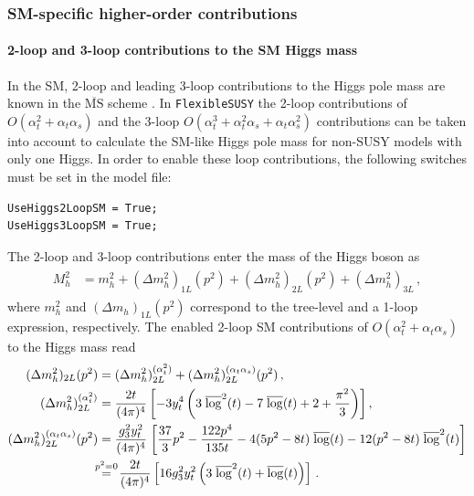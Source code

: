 \documentclass[final,3p,11pt,pdflatex]{elsarticle}
\makeatletter
\newcommand{\fs}{\texttt{FlexibleSUSY}\@\xspace}
\newcommand{\ol}[1]{\overline{#1}}
\newcommand{\MSbar}{\ensuremath{\ol{\text{MS}}}\xspace}
\newcommand{\barlog}{\overline{\log}}
\def\at{\alpha_t}
\def\as{\alpha_s}
\makeatother
\begin{document}
\subsubsection{SM-specific higher-order contributions}

\paragraph{2-loop and 3-loop contributions to the SM Higgs mass}

In the SM, 2-loop and leading 3-loop contributions to the Higgs pole
mass are known in the \MSbar scheme
\cite{Degrassi:2012ry,Vega:2015fna,Martin:2014cxa}.  In \fs the 2-loop
contributions of $O(\at^2 + \at \as)$
\cite{Vega:2015fna,Martin:2014cxa} and the 3-loop
$O(\at^3 + \at^2 \as + \at \as^2)$ contributions \cite{Martin:2014cxa}
can be taken into account to calculate the SM-like Higgs pole mass for
non-SUSY models with only one Higgs. In order to enable these loop
contributions, the following switches must be set in the model file:
%
\begin{lstlisting}
UseHiggs2LoopSM = True;
UseHiggs3LoopSM = True;
\end{lstlisting}
%
The 2-loop and 3-loop
contributions enter the mass of the Higgs boson as
\begin{align} 
 \begin{split}
   M_h^2 &= m_h^2 + (\Delta m_h^2)_{1L}(p^2)
   + (\Delta m_h^2)_{2L}(p^2) +(\Delta m_h^2)_{3L} \,,
 \end{split} \label{eq:Mh_polp^2}
\end{align}
where $m_h^2$ and $(\Delta m_h)_{1L}(p^2)$ correspond to the tree-level 
and a 1-loop expression, respectively.
The enabled 2-loop SM contributions of
$O(\at^2 + \at \as)$ to the Higgs mass read
%
\begin{align}
  (\Delta m_h^2)_{2L}(p^2) &= (\Delta m_h^2)_{2L}^{(\at^2)} + 
     (\Delta m_h^2)_{2L}^{(\at\as)}(p^2) \,, \\
  (\Delta m_h^2)_{2L}^{(\at^2)} &=
  \frac{2 t}{(4\pi)^4} \left[
    -3 y_t^4 \left(3 \;\barlog^2(t) - 7 \;\barlog(t) + 2 + \frac{\pi^2}{3}\right)
  \right] , \label{eq:2L_Mh_atat}\\
  (\Delta m_h^2)_{2L}^{(\at\as)} (p^2)&=
      \frac{g_3^2 y_t^2}{(4\pi)^4} \;\bigg[
        \frac{37}{3} p^2 - \frac{122 p^4}{135 t} - 4 (5 p^2 - 8 t) \;\barlog(t) -
        12 (p^2 - 8 t) \;\barlog^2(t) \bigg] \label{eq:2L_Mh_atas} \\
  &\stackrel{\mathmakebox[\widthof{=}]{p^2=0}}{=} \
  \frac{2 t}{(4\pi)^4} \left[
    16 g_3^2 y_t^2 \left(3 \;\barlog^2(t) + \barlog(t)\right)
  \right] \,.
  \label{eq:2L_Mh_atas p2=0}
\end{align}
\end{document}
